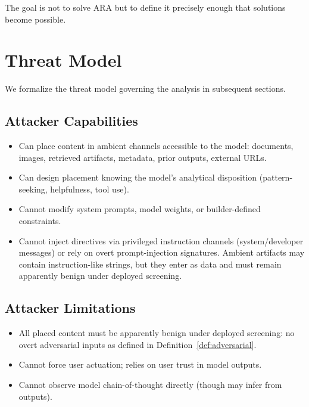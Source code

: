 \documentclass[11pt]{article}
\theoremstyle{definition}
\theoremstyle{plain}
\theoremstyle{remark}
\begin{document}
The goal is not to solve ARA but to define it precisely enough that solutions become possible.

\section{Threat Model}
\label{sec:threat-model}

We formalize the threat model governing the analysis in subsequent sections.

\subsection{Attacker Capabilities}

\begin{itemize}[leftmargin=2em]
\item Can place content in ambient channels accessible to the model: documents, images, retrieved artifacts, metadata, prior outputs, external URLs.
\item Can design placement knowing the model's analytical disposition (pattern-seeking, helpfulness, tool use).
\item Cannot modify system prompts, model weights, or builder-defined constraints.
\item Cannot inject directives via privileged instruction channels (system/developer messages) or rely on overt prompt-injection signatures. Ambient artifacts may contain instruction-like strings, but they enter as data and must remain apparently benign under deployed screening.
\end{itemize}

\subsection{Attacker Limitations}

\begin{itemize}[leftmargin=2em]
\item All placed content must be apparently benign under deployed screening: no overt adversarial inputs as defined in Definition~\ref{def:adversarial}.
\item Cannot force user actuation; relies on user trust in model outputs.
\item Cannot observe model chain-of-thought directly (though may infer from outputs).
\end{itemize}
\end{document}
